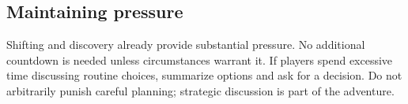 \subsection{Maintaining pressure}

Shifting and discovery already provide substantial pressure. No additional countdown is needed unless circumstances warrant it. If players spend excessive time discussing routine choices, summarize options and ask for a decision. Do not arbitrarily punish careful planning; strategic discussion is part of the adventure.
